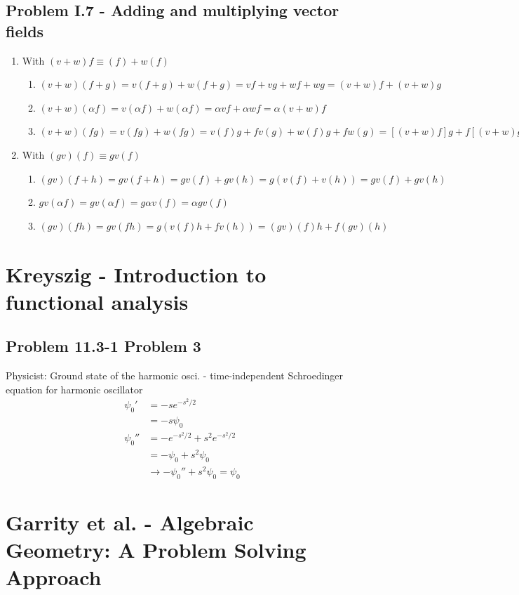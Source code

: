 \documentclass[10pt,a4paper]{book}
\theoremstyle{definition}
\begin{document}
\subsection{Problem I.7 - Adding and multiplying vector fields}
\begin{enumerate}
    \item With $(v+w)f\equiv(f)+w(f)$
    \begin{enumerate}
        \item $(v+w)(f+g)=v(f+g)+w(f+g)=vf+vg+wf+wg=(v+w)f+(v+w)g$
        \item $(v+w)(\alpha f)=v(\alpha f)+w(\alpha f)=\alpha v f+\alpha w f=\alpha(v+w)f$
        \item $(v+w)(fg)=v(fg)+w(fg)=v(f)g+fv(g)+w(f)g+fw(g)=[(v+w)f]g+f[(v+w)g]$
    \end{enumerate}
    \item With $(gv)(f)\equiv gv(f)$
    \begin{enumerate}
        \item $(gv)(f+h)=gv(f+h)=gv(f)+gv(h)=g(v(f)+v(h))=gv(f)+gv(h)$
        \item $gv(\alpha f)=gv(\alpha f)=g\alpha v(f)=\alpha gv(f)$
        \item $(gv)(fh)=gv(fh)=g(v(f)h+fv(h))=(gv)(f)h+f(gv)(h)$
    \end{enumerate}
\end{enumerate}

\section{{\sc Kreyszig} - Introduction to functional analysis}
\subsection{Problem 11.3-1 Problem 3}
Physicist: Ground state of the harmonic osci. - time-independent Schroedinger equation for harmonic oscillator
\begin{align}
\psi_0'&=-se^{-s^2/2}\\
&=-s\psi_0\\
\psi_0''&=-e^{-s^2/2}+s^2e^{-s^2/2}\\
&=-\psi_0+s^2\psi_0\\
&\rightarrow -\psi_0''+s^2\psi_0=\psi_0
\end{align}

\section{{\sc Garrity} et al. - Algebraic Geometry: A Problem Solving Approach}
\end{document}

